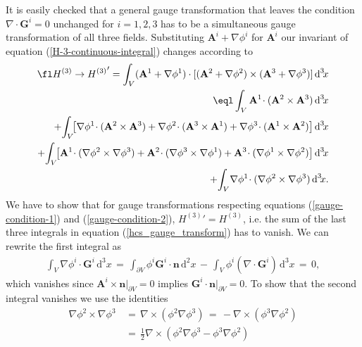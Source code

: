 \documentclass[10pt]{iopart}
\def \d{\mbox{d}}
\def \dxx{\,\d^{2}\!x}
\def \dxxx{\,\d^{3}\!x}
\def \Eq{equation }
\def \p{{\partial}}
\def \bA{{\mathbf{A}}}
\def \bG{{\mathbf{G}}}
\def \bn{{\mathbf{n}}}
\begin{document}
It is easily checked that a general gauge transformation that leaves the
condition
   $\nabla\cdot\bG^i = 0$
unchanged for $i=1,2,3$
has to be a simultaneous gauge transformation of all three fields. 
Substituting  $\bA^i + \nabla \phi^i$ for $\bA^i$ our invariant of
\Eq (\ref{H-3-continuous-integral}) changes according to
\begin{eqnarray}
\fl
H^{(3)} \rightarrow {H^{(3)}}' 
     =  \int_V (\bA^1 + \nabla \phi^1)\cdot
             [(\bA^2 + \nabla \phi^2)\times(\bA^3 + \nabla   \phi^3)]\dxxx \\
     \eql  \int_V \bA^1 \!\cdot (\bA^2 \times \bA^3) \dxxx \nonumber\\
     +\!\int_V\! \bigl[    \nabla\phi^1\!\cdot(\bA^2 \times \bA^3) 
                     + \nabla\phi^2\!\cdot(\bA^3 \times \bA^1) 
                     + \nabla\phi^3\!\cdot(\bA^1 \times \bA^2) \bigr]\dxxx \nonumber\\ 
     +\!\int_V\! \bigl[   \bA^1\!\cdot( \nabla \phi^2 \times \nabla \phi^3)
                    + \bA^2\!\cdot( \nabla \phi^3 \times \nabla \phi^1)
                    + \bA^3\!\cdot( \nabla \phi^1 \times \nabla\phi^2)
                                                                  \bigr]\dxxx\nonumber\\
     +\!\int_V\!  \nabla \phi^1\!\cdot(\nabla \phi^2 \times \nabla \phi^3) \dxxx.\nonumber
\label{hcs_gauge_transform}
\end{eqnarray}
{\sloppy
We have to show that for gauge transformations respecting 
equations (\ref{gauge-condition-1}) and (\ref{gauge-condition-2}),
\mbox{${H^{(3)}}' =  H^{(3)}$},
i.e. the sum of the last three integrals in
\Eq (\ref{hcs_gauge_transform})  has to vanish.
We can rewrite the first integral as
\begin{eqnarray}
\int_V      \nabla\phi^i\cdot\bG^i \dxxx
\,=\,
        \int_{\p V} \phi^i\bG^i\cdot\bn\dxx     
        \,-\,\int_V      \phi^i(\nabla\cdot\bG^i)
        \dxxx
\,=\,  0,\nonumber
\end{eqnarray}
which vanishes 
since $\bA^i\times\bn|_{\p V}=0$ implies $\bG^i\cdot\bn|_{\p V}=0$.
}%
To show that the second integral vanishes we use the identities
\begin{eqnarray}
\nabla \phi^2 \times \nabla \phi^3 &\,=\,\nabla\times(\phi^2 \nabla \phi^3) 
                                    \,=\,-\nabla\times(\phi^3 \nabla \phi^2)\\
&\,=\, \frac{1}{2}\nabla\times( \phi^2 \nabla \phi^3 - \phi^3 \nabla \phi^2) 
\label{first-identity}
\end{eqnarray}
\end{document}
